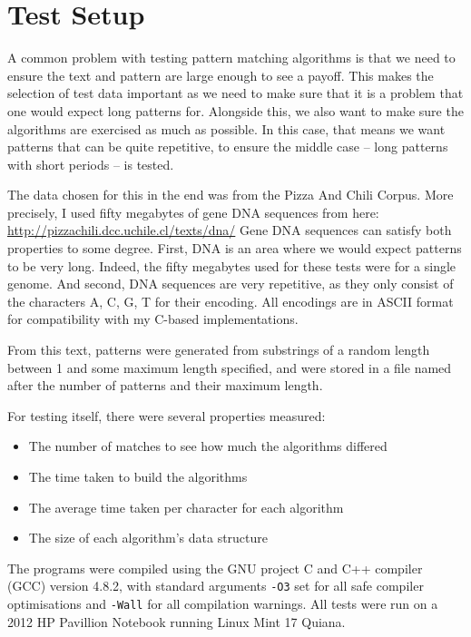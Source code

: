 \documentclass[ %
                    author={Dominic Joseph Moylett},
                    degree={MEng},
                     title={Dictionary Matching with Fingerprints},
                  subtitle={An Empirical Analysis},
                      type={research},
                      year={2015} ]{dissertation}
\begin{document}
\section{Test Setup}

A common problem with testing pattern matching algorithms is that we need to ensure the text and pattern are large enough to see a payoff. This makes the selection of test data important as we need to make sure that it is a problem that one would expect long patterns for. Alongside this, we also want to make sure the algorithms are exercised as much as possible. In this case, that means we want patterns that can be quite repetitive, to ensure the middle case -- long patterns with short periods -- is tested.

The data chosen for this in the end was from the Pizza And Chili Corpus. More precisely, I used fifty megabytes of gene DNA sequences from here: \url{http://pizzachili.dcc.uchile.cl/texts/dna/} Gene DNA sequences can satisfy both properties to some degree. First, DNA is an area where we would expect patterns to be very long. Indeed, the fifty megabytes used for these tests were for a single genome. And second, DNA sequences are very repetitive, as they only consist of the characters A, C, G, T for their encoding. All encodings are in ASCII format for compatibility with my C-based implementations.

From this text, patterns were generated from substrings of a random length between 1 and some maximum length specified, and were stored in a file named after the number of patterns and their maximum length.

For testing itself, there were several properties measured:

\begin{itemize}
  \item The number of matches to see how much the algorithms differed
  \item The time taken to build the algorithms
  \item The average time taken per character for each algorithm
  \item The size of each algorithm's data structure
\end{itemize}

The programs were compiled using the GNU project C and C++ compiler (GCC) version 4.8.2, with standard arguments \texttt{-O3} set for all safe compiler optimisations and \texttt{-Wall} for all compilation warnings. All tests were run on a 2012 HP Pavillion Notebook running Linux Mint 17 Quiana.
\end{document}
